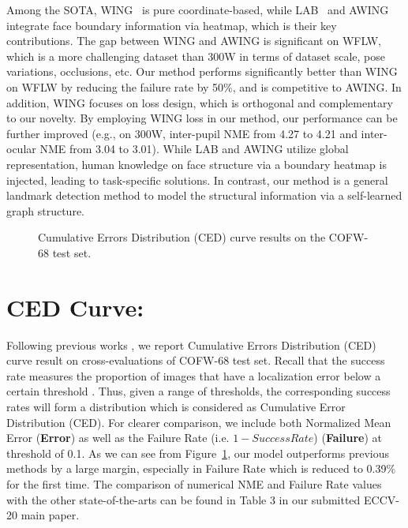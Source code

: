 \documentclass[runningheads]{llncs}
\begin{document}
Among the SOTA, WING~\cite{feng2018wing} is pure coordinate-based, while LAB~\cite{wu2018look} and AWING~\cite{wang2019adaptive} integrate face boundary information via heatmap, which is their key contributions. The gap between WING and AWING is significant on WFLW, which is a more challenging dataset than 300W in terms of dataset scale, pose variations, occlusions, etc. Our method performs significantly better than WING on WFLW by reducing the failure rate by 50\%, and is competitive to AWING. In addition, WING focuses on loss design, which is orthogonal and complementary to our novelty. By employing WING loss in our method, our performance can be further improved (e.g., on 300W, inter-pupil NME from 4.27 to 4.21 and inter-ocular NME from 3.04 to 3.01). While LAB and AWING utilize global representation, human knowledge on face structure via a boundary heatmap is injected, leading to task-specific solutions. In contrast, our method is a general landmark detection method to model the structural information via a self-learned graph structure. 

\begin{figure}[t]
	\centering
\caption{Cumulative Errors Distribution (CED) curve results on the COFW-68 test set.}
	\label{fig:ced}
\end{figure}


\section{CED Curve:}
Following previous works \cite{wu2018look,qian2019aggregation}, we report Cumulative Errors Distribution (CED) curve result on cross-evaluations of COFW-68 test set. Recall that the success rate measures the proportion of images that have a localization error below a certain threshold \cite{ghiasi2015occlusion}. Thus, given a range of thresholds, the corresponding success rates will form a distribution which is considered as Cumulative Error Distribution (CED). For clearer comparison, we include both Normalized Mean Error (\textbf{Error}) as well as the Failure Rate (i.e. $1-Success Rate$) (\textbf{Failure})  at threshold of 0.1. As we can see from Figure~\ref{fig:ced}, our model outperforms previous methods by a large margin, especially in Failure Rate which is reduced to 0.39\% for the first time. The comparison of numerical NME and Failure Rate values with the other state-of-the-arts can be found in Table 3 in our submitted ECCV-20 main paper.
\end{document}

